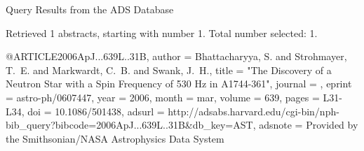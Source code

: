 Query Results from the ADS Database


Retrieved 1 abstracts, starting with number 1.  Total number selected: 1.

@ARTICLE{2006ApJ...639L..31B,
   author = {{Bhattacharyya}, S. and {Strohmayer}, T.~E. and {Markwardt}, C.~B. and 
	{Swank}, J.~H.},
    title = "{The Discovery of a Neutron Star with a Spin Frequency of 530 Hz in A1744-361}",
  journal = {\apjl},
   eprint = {astro-ph/0607447},
     year = 2006,
    month = mar,
   volume = 639,
    pages = {L31-L34},
      doi = {10.1086/501438},
   adsurl = {http://adsabs.harvard.edu/cgi-bin/nph-bib_query?bibcode=2006ApJ...639L..31B&db_key=AST},
  adsnote = {Provided by the Smithsonian/NASA Astrophysics Data System}
}



